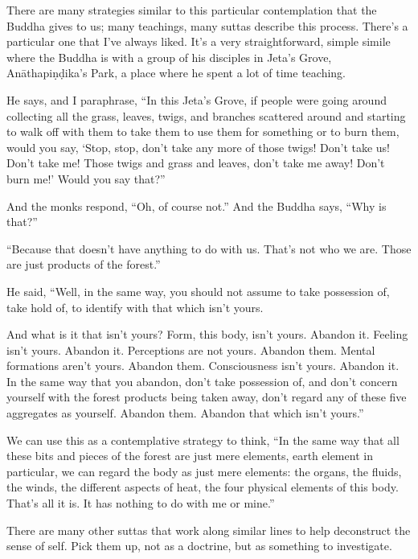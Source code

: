 \enlargethispage{1\baselineskip}
There are many strategies similar to this particular contemplation that the Buddha gives to us; many teachings, many suttas describe this process. There's a particular one that I've always liked. It's a very straightforward, simple simile where the Buddha is with a group of his disciples in Jeta's Grove, Anāthapiṇḍika's Park, a place where he spent a lot of time teaching.

He says, and I paraphrase, ``In this Jeta's Grove, if people were going around collecting all the grass, leaves, twigs, and branches scattered around and starting to walk off with them to take them to use them for something or \linebreak to burn them, would you say, `Stop, stop, don't take any more of those twigs! Don't take us! Don't take me! Those twigs and grass and leaves, don't take me away! Don't burn me!' Would you say that?''

And the monks respond, ``Oh, of course not.'' And the Buddha says, ``Why is that?''

``Because that doesn't have anything to do with us. That's not who we are. Those are just products of the forest.''

He said, ``Well, in the same way, you should not assume to take possession of, take hold of, to identify with that which isn't yours.

\enlargethispage{1\baselineskip}
And what is it that isn't yours? Form, this body, isn't yours. Abandon it. Feeling isn't yours. Abandon it. Perceptions are not yours. Abandon them. Mental formations aren't yours. Abandon them. Consciousness isn't yours. Abandon it. In the same way that you abandon, don't take possession of, and don't concern yourself with the forest products being taken away, don't regard any of these five aggregates as yourself. Abandon them. Abandon that which isn't yours.''

We can use this as a contemplative strategy to think, ``In the same way that all these bits and pieces of the forest are just mere elements, earth element in particular, we can regard the body as just mere elements: the organs, the fluids, the winds, the different aspects of heat, the four physical elements of this body. That's all it is. It has nothing to do with me or mine.''

There are many other suttas that work along similar lines to help deconstruct the sense of self. Pick them up, not as a doctrine, but as something to investigate.

